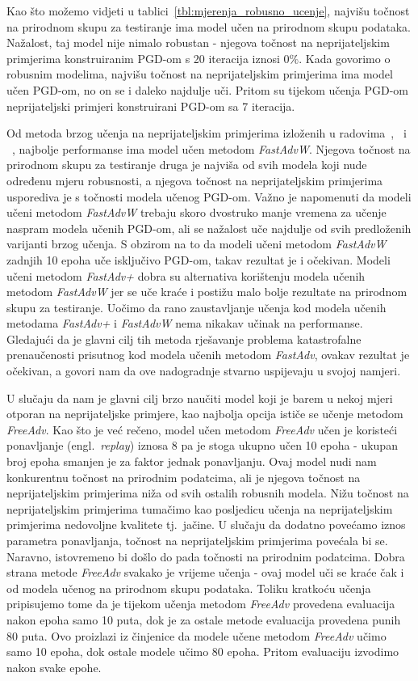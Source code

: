 \documentclass[times, utf8, zavrsni, numeric]{fer}
\begin{document}
Kao što možemo vidjeti u tablici~\ref{tbl:mjerenja_robusno_ucenje}, najvišu točnost na prirodnom skupu za testiranje ima model učen na prirodnom skupu podataka.
Nažalost, taj model nije nimalo robustan - njegova točnost na neprijateljskim primjerima konstruiranim PGD-om s 20 iteracija iznosi $0\%$.
Kada govorimo o robusnim modelima, najvišu točnost na neprijateljskim primjerima ima model učen PGD-om, no on se i daleko najdulje uči.
Pritom su tijekom učenja PGD-om neprijateljski primjeri konstruirani PGD-om sa 7 iteracija.

Od metoda brzog učenja na neprijateljskim primjerima izloženih u radovima~\cite{shafahi2019adversarial},~\cite{wong2020fast} i ~\cite{li2020towards},
najbolje performanse ima model učen metodom \textit{FastAdvW}. Njegova točnost na prirodnom skupu za testiranje druga je najviša od svih modela koji nude određenu mjeru robusnosti,
a njegova točnost na neprijateljskim primjerima usporediva je s točnosti modela učenog PGD-om. 
Važno je napomenuti da modeli učeni metodom \textit{FastAdvW} trebaju skoro dvostruko manje vremena za učenje naspram modela učenih PGD-om, ali se nažalost uče najdulje od svih predloženih varijanti brzog učenja.
S obzirom na to da modeli učeni metodom \textit{FastAdvW} zadnjih 10 epoha uče isključivo PGD-om, takav rezultat je i očekivan.
Modeli učeni metodom \textit{FastAdv+} dobra su alternativa korištenju modela učenih metodom \textit{FastAdvW} jer se uče kraće i postižu malo bolje rezultate na prirodnom skupu za testiranje.
Uočimo da rano zaustavljanje učenja kod modela učenih metodama \textit{FastAdv+} i \textit{FastAdvW} nema nikakav učinak na performanse. 
Gledajući da je glavni cilj tih metoda rješavanje problema katastrofalne prenaučenosti prisutnog kod modela učenih metodom \textit{FastAdv}, ovakav rezultat je očekivan, 
a govori nam da ove nadogradnje stvarno uspijevaju u svojoj namjeri.

U slučaju da nam je glavni cilj brzo naučiti model koji je barem u nekoj mjeri otporan na neprijateljske primjere, kao najbolja opcija ističe se učenje metodom \textit{FreeAdv}.
Kao što je već rečeno, model učen metodom \textit{FreeAdv} učen je koristeći ponavljanje (engl.\ \textit{replay}) iznosa 8 pa je stoga ukupno učen 10 epoha - ukupan broj epoha smanjen je za faktor jednak ponavljanju.
Ovaj model nudi nam konkurentnu točnost na prirodnim podatcima, ali je njegova točnost na neprijateljskim primjerima niža od svih ostalih robusnih modela. 
Nižu točnost na neprijateljskim primjerima tumačimo kao posljedicu učenja na neprijateljskim primjerima nedovoljne kvalitete tj.\ jačine. 
U slučaju da dodatno povećamo iznos parametra ponavljanja, točnost na neprijateljskim primjerima povećala bi se. Naravno, istovremeno bi došlo do pada točnosti na prirodnim podatcima.
Dobra strana metode \textit{FreeAdv} svakako je vrijeme učenja - ovaj model uči se kraće čak i od modela učenog na prirodnom skupu podataka. 
Toliku kratkoću učenja pripisujemo tome da je tijekom učenja metodom \textit{FreeAdv} provedena evaluacija nakon epoha samo 10 puta, dok je za ostale metode evaluacija provedena punih 80 puta.
Ovo proizlazi iz činjenice da modele učene metodom \textit{FreeAdv} učimo samo 10 epoha, dok ostale modele učimo 80 epoha. Pritom evaluaciju izvodimo nakon svake epohe.
\end{document}
